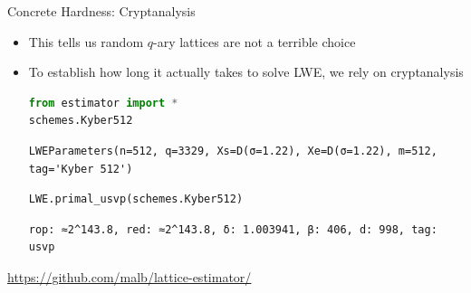 \documentclass[xcolor=table,10pt,aspectratio=169]{beamer}
\begin{document}
\begin{frame}[label={sec:org592ad5e},fragile]{Concrete Hardness: Cryptanalysis}
 \begin{itemize}
\item This tells us random \(q\)-ary lattices are not a terrible choice
\item To establish how long it actually takes to solve LWE, we rely on cryptanalysis

\begin{lstlisting}[language=Python,numbers=none]
from estimator import *
schemes.Kyber512
\end{lstlisting}

\label{}
\begin{verbatim}
LWEParameters(n=512, q=3329, Xs=D(σ=1.22), Xe=D(σ=1.22), m=512, tag='Kyber 512')
\end{verbatim}


\begin{lstlisting}[language=Python,numbers=none]
LWE.primal_usvp(schemes.Kyber512)
\end{lstlisting}

\label{}
\begin{verbatim}
rop: ≈2^143.8, red: ≈2^143.8, δ: 1.003941, β: 406, d: 998, tag: usvp
\end{verbatim}
\end{itemize}

\begin{center}
\url{https://github.com/malb/lattice-estimator/}
\end{center}
\end{frame}
\end{document}
